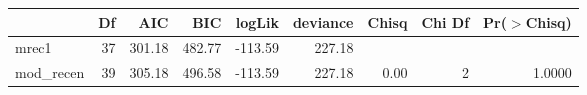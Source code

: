 \begin{table}[ht]
\centering
\begin{tabular}{lrrrrrrrr}
  \hline
 & Df & AIC & BIC & logLik & deviance & Chisq & Chi Df & Pr($>$Chisq) \\ 
  \hline
mrec1 & 37 & 301.18 & 482.77 & -113.59 & 227.18 &  &  &  \\ 
  mod\_recen & 39 & 305.18 & 496.58 & -113.59 & 227.18 & 0.00 & 2 & 1.0000 \\ 
   \hline
\end{tabular}
\end{table}
